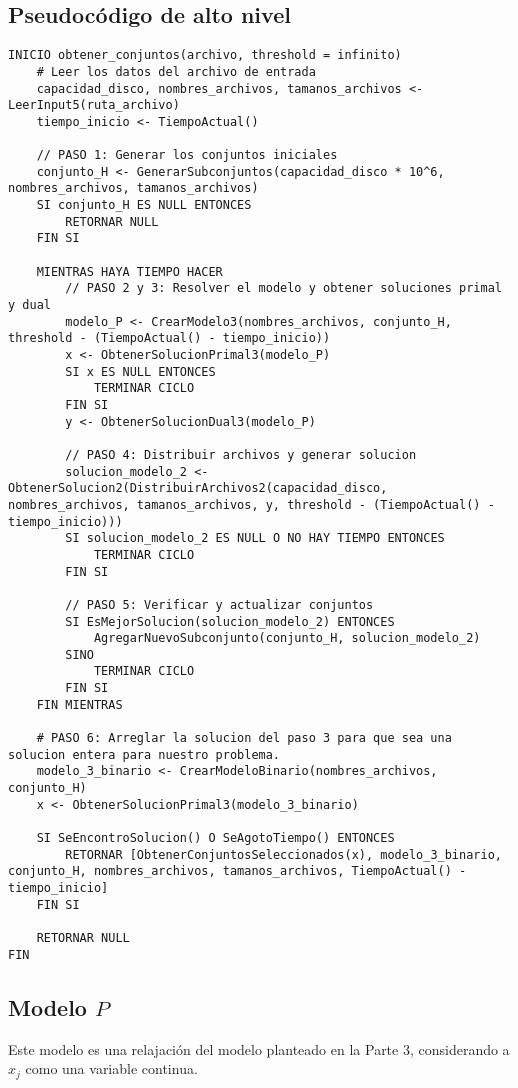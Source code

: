 \documentclass[11pt, a4paper, pdftex]{article}
\begin{document}
\subsection{Pseudocódigo de alto nivel}
\begin{lstlisting}
INICIO obtener_conjuntos(archivo, threshold = infinito)
    # Leer los datos del archivo de entrada
    capacidad_disco, nombres_archivos, tamanos_archivos <- LeerInput5(ruta_archivo)
    tiempo_inicio <- TiempoActual()
    
    // PASO 1: Generar los conjuntos iniciales
    conjunto_H <- GenerarSubconjuntos(capacidad_disco * 10^6, nombres_archivos, tamanos_archivos)
    SI conjunto_H ES NULL ENTONCES
        RETORNAR NULL
    FIN SI
    
    MIENTRAS HAYA TIEMPO HACER
        // PASO 2 y 3: Resolver el modelo y obtener soluciones primal y dual
        modelo_P <- CrearModelo3(nombres_archivos, conjunto_H, threshold - (TiempoActual() - tiempo_inicio))
        x <- ObtenerSolucionPrimal3(modelo_P)
        SI x ES NULL ENTONCES
            TERMINAR CICLO
        FIN SI
        y <- ObtenerSolucionDual3(modelo_P)
        
        // PASO 4: Distribuir archivos y generar solucion
        solucion_modelo_2 <- ObtenerSolucion2(DistribuirArchivos2(capacidad_disco, nombres_archivos, tamanos_archivos, y, threshold - (TiempoActual() - tiempo_inicio)))
        SI solucion_modelo_2 ES NULL O NO HAY TIEMPO ENTONCES
            TERMINAR CICLO
        FIN SI

        // PASO 5: Verificar y actualizar conjuntos
        SI EsMejorSolucion(solucion_modelo_2) ENTONCES
            AgregarNuevoSubconjunto(conjunto_H, solucion_modelo_2)
        SINO
            TERMINAR CICLO
        FIN SI
    FIN MIENTRAS
    
    # PASO 6: Arreglar la solucion del paso 3 para que sea una solucion entera para nuestro problema.
    modelo_3_binario <- CrearModeloBinario(nombres_archivos, conjunto_H)
    x <- ObtenerSolucionPrimal3(modelo_3_binario)
    
    SI SeEncontroSolucion() O SeAgotoTiempo() ENTONCES
        RETORNAR [ObtenerConjuntosSeleccionados(x), modelo_3_binario, conjunto_H, nombres_archivos, tamanos_archivos, TiempoActual() - tiempo_inicio]
    FIN SI
    
    RETORNAR NULL
FIN
\end{lstlisting}

\subsection{Modelo $P$}
Este modelo es una relajación del modelo planteado en la Parte 3, considerando a $x_{j}$ como una variable continua.
\end{document}
